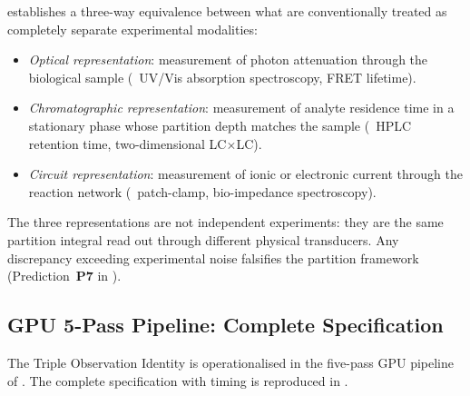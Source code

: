 \begin{remark}
 establishes a three-way equivalence between
what are conventionally treated as completely separate experimental modalities:
\begin{itemize}[leftmargin=2em]
  \item \emph{Optical representation}: measurement of photon attenuation
    through the biological sample (\eg\ UV/Vis absorption spectroscopy, FRET
    lifetime).
  \item \emph{Chromatographic representation}: measurement of analyte
    residence time in a stationary phase whose partition depth matches the
    sample (\eg\ HPLC retention time, two-dimensional LC$\times$LC).
  \item \emph{Circuit representation}: measurement of ionic or electronic
    current through the reaction network (\eg\ patch-clamp, bio-impedance
    spectroscopy).
\end{itemize}
The three representations are not independent experiments: they are the same
partition integral read out through different physical transducers.  Any
discrepancy exceeding experimental noise falsifies the partition framework
(Prediction~\textbf{P7} in ).
\end{remark}

\subsection{GPU 5-Pass Pipeline: Complete Specification}
\label{subsec:ch09-gpu-5pass}

The Triple Observation Identity is operationalised in the five-pass GPU
pipeline of .  The complete specification with timing
is reproduced in .

